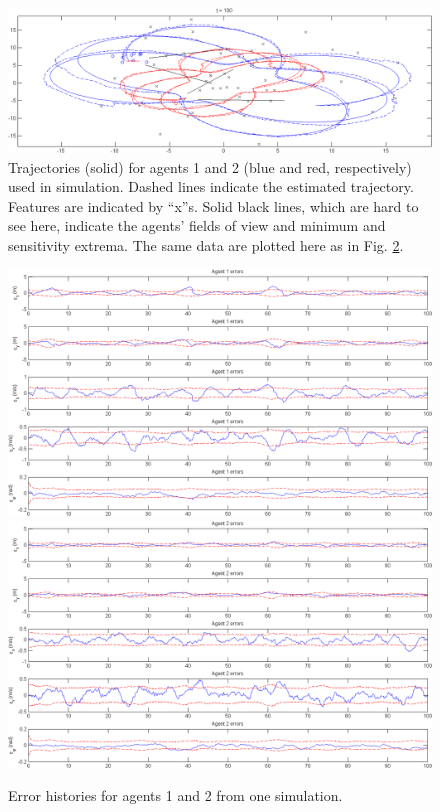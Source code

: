 \documentclass{aiaa-tc}
\begin{document}
\begin{figure}[h!]
\centering
\includegraphics[width=\textwidth]{traj_typ.png}
\caption{Trajectories (solid) for agents 1 and 2 (blue and red, respectively) used in simulation. Dashed lines indicate the estimated trajectory. Features are indicated by ``x''s. Solid black lines, which are hard to see here, indicate the agents' fields of view and minimum and sensitivity extrema. The same data are plotted here as in Fig. \ref{fig:agent_typ}.}
\label{fig:traj_typ}
\end{figure}

\begin{figure}[h!]
\centering
\includegraphics[width=\textwidth]{agent1_typ.png}
\includegraphics[width=\textwidth]{agent2_typ.png}
\caption{Error histories for agents 1 and 2 from one simulation.}
\label{fig:agent_typ}
\end{figure}
\end{document}
